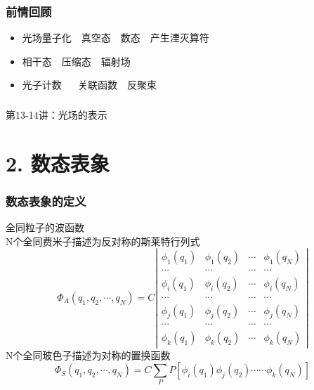 \begin{frame}
    \frametitle{前情回顾}
    \begin{itemize}
        \item 光场量子化~~真空态~~数态~~产生湮灭算符 
        \item 相干态~~压缩态~~辐射场 
        \item 光子计数 ~~ 关联函数~~反聚束
    \end{itemize}     
\end{frame}

\begin{frame} [plain]
    \frametitle{}
    \Background[1] 
    \begin{center}
    {\huge 第13-14讲：光场的表示}
    \end{center}  
    \addtocounter{framenumber}{-1}   
\end{frame}

\section{2. 数态表象 }

\begin{frame} 
\frametitle{数态表象的定义}
{\Bullet}全同粒子的波函数 \\ 
   N个全同费米子描述为反对称的斯莱特行列式
   \[ \Phi_{A}\left(q_{1}, q_{2}, \cdots, q_{N}\right)=C\left|\begin{array}{cccc}
    \phi_{1}\left(q_{1}\right) & \phi_{1}\left(q_{2}\right) & \cdots & \phi_{1}\left(q_{N}\right) \\
    \cdots & \cdots & \cdots & \cdots \\
    \phi_{i}\left(q_{1}\right) & \phi_{i}\left(q_{2}\right) & \cdots & \phi_{i}\left(q_{N}\right) \\
    \cdots & \cdots & \cdots & \cdots \\
    \phi_{j}\left(q_{1}\right) & \phi_{j}\left(q_{2}\right) & \cdots & \phi_{j}\left(q_{N}\right) \\
    \cdots & \cdots & \cdots & \cdots \\
    \phi_{k}\left(q_{1}\right) & \phi_{k}\left(q_{2}\right) & \cdots & \phi_{k}\left(q_{N}\right)
    \end{array}\right|\]
    N个全同玻色子描述为对称的置换函数
    \[\Phi_{S}\left(q_{1}, q_{2}, \cdots, q_{N}\right)=C \sum_{P} P [\phi_{i}\left(q_{1}\right) \phi_{j}\left(q_{2}\right) \cdots \cdots \phi_{k}\left(q_{N}\right)] \]
\end{frame}

